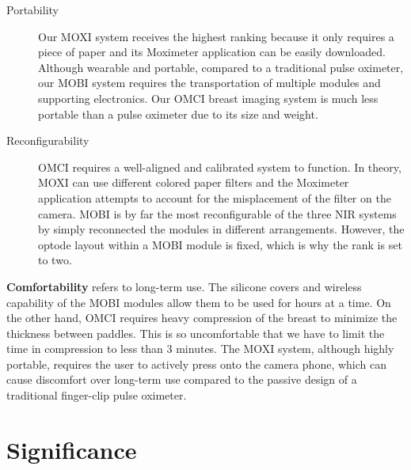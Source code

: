 \begin{description}
   \item[Portability] Our \ac{MOXI} system receives the highest ranking because it only requires a piece of paper and its Moximeter application can be easily downloaded. Although wearable and portable, compared to a traditional pulse oximeter, our \ac{MOBI} system requires the transportation of multiple modules and supporting electronics. Our \ac{OMCI} breast imaging system is much less portable than a pulse oximeter due to its size and weight.
   
   \item[Reconfigurability] \ac{OMCI} requires a well-aligned and calibrated system to function. In theory, \ac{MOXI} can use different colored paper filters and the Moximeter application attempts to account for the misplacement of the filter on the camera. \ac{MOBI} is by far the most reconfigurable of the three \ac{NIR} systems by simply reconnected the modules in different arrangements. However, the optode layout within a \ac{MOBI} module is fixed, which is why the rank is set to two. 
\end{description}






\textbf{Comfortability} refers to long-term use. The silicone covers and wireless capability of the \ac{MOBI} modules allow them to be used for hours at a time. On the other hand, \ac{OMCI} requires heavy compression of the breast to minimize the thickness between paddles. This is so uncomfortable that we have to limit the time in compression to less than 3 minutes. The \ac{MOXI} system, although highly portable, requires the user to actively press onto the camera phone, which can cause discomfort over long-term use compared to the passive design of a traditional finger-clip pulse oximeter. 




\section{Significance}